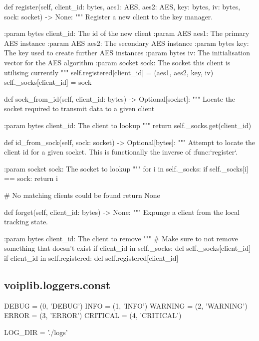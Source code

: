\begin{pythoncode}
    def register(self, client_id: bytes, aes1: AES, aes2: AES, key: bytes,
                 iv: bytes, sock: socket) -> None:
        """
        Register a new client to the key manager.

        :param bytes client_id: The id of the new client
        :param AES aes1: The primary AES instance
        :param AES aes2: The secondary AES instance
        :param bytes key: The key used to create further AES instances
        :param bytes iv: The initialisation vector for the AES algorithm
        :param socket sock: The socket this client is utilising currently
        """
        self.registered[client_id] = (aes1, aes2, key, iv)
        self._socks[client_id] = sock

    def sock_from_id(self, client_id: bytes) -> Optional[socket]:
        """
        Locate the socket required to transmit data to a given client

        :param bytes client_id: The client to lookup
        """
        return self._socks.get(client_id)

    def id_from_sock(self, sock: socket) -> Optional[bytes]:
        """
        Attempt to locate the client id for a given socket.
        This is functionally the inverse of :func:`register`.

        :param socket sock: The socket to lookup
        """
        for i in self._socks:
            if self._socks[i] == sock:
                return i

        # No matching clients could be found
        return None

    def forget(self, client_id: bytes) -> None:
        """
        Expunge a client from the local tracking state.

        :param bytes client_id: The client to remove
        """
        # Make sure to not remove something that doesn't exist
        if client_id in self._socks:
            del self._socks[client_id]
        if client_id in self.registered:
            del self.registered[client_id]
\end{pythoncode}
\subsection{voiplib.loggers.const}
\begin{pythoncode}
DEBUG = (0, 'DEBUG')
INFO = (1, 'INFO')
WARNING = (2, 'WARNING')
ERROR = (3, 'ERROR')
CRITICAL = (4, 'CRITICAL')

LOG_DIR = './logs'
\end{pythoncode}
